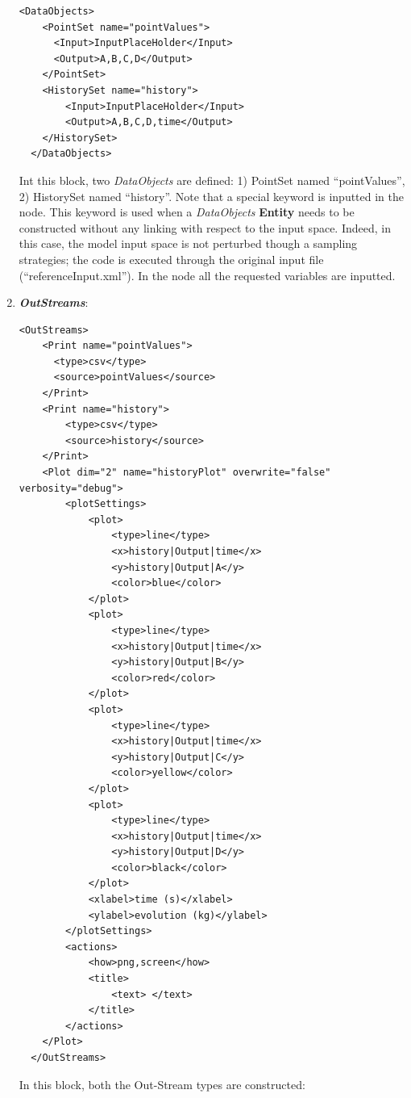 \begin{enumerate}
\begin{lstlisting}[style=XML,morekeywords={arg,extension,pauseAtEnd,overwrite}]
  <DataObjects>
    <PointSet name="pointValues">
      <Input>InputPlaceHolder</Input>
      <Output>A,B,C,D</Output>
    </PointSet>
    <HistorySet name="history">
        <Input>InputPlaceHolder</Input>
        <Output>A,B,C,D,time</Output>
    </HistorySet>
  </DataObjects>
\end{lstlisting}
  Int this block, two \textit{DataObjects} are defined: 1) PointSet named ``pointValues'', 2) HistorySet named ``history''.
  Note that a special keyword is inputted in the  node. This keyword is used when a \textit{DataObjects}  \textbf{Entity} needs to be constructed without any linking with respect to the input space. Indeed, in 
  this case, the model input space is not perturbed though a sampling strategies; the code is executed through the original
   input file   (``referenceInput.xml''). In the  node all the requested variables are inputted.
   \item \textbf{\textit{OutStreams}}:   
\begin{lstlisting}[style=XML,morekeywords={arg,extension,pauseAtEnd,overwrite}]
  <OutStreams>
    <Print name="pointValues">
      <type>csv</type>
      <source>pointValues</source>
    </Print>
    <Print name="history">
        <type>csv</type>
        <source>history</source>
    </Print>
    <Plot dim="2" name="historyPlot" overwrite="false" verbosity="debug">
        <plotSettings>
            <plot>
                <type>line</type>
                <x>history|Output|time</x>
                <y>history|Output|A</y>
                <color>blue</color>
            </plot>
            <plot>
                <type>line</type>
                <x>history|Output|time</x>
                <y>history|Output|B</y>
                <color>red</color>
            </plot>
            <plot>
                <type>line</type>
                <x>history|Output|time</x>
                <y>history|Output|C</y>
                <color>yellow</color>
            </plot>
            <plot>
                <type>line</type>
                <x>history|Output|time</x>
                <y>history|Output|D</y>
                <color>black</color>
            </plot>
            <xlabel>time (s)</xlabel>
            <ylabel>evolution (kg)</ylabel>
        </plotSettings>
        <actions>
            <how>png,screen</how>
            <title>
                <text> </text>
            </title>
        </actions>
    </Plot>
  </OutStreams>
\end{lstlisting}
  In this block, both the Out-Stream types are constructed: 

\end{enumerate}
